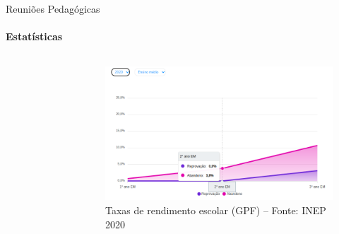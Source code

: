 \documentclass[aspectratio=169]{beamer}
\begin{document}
\begin{frame}{Reuniões Pedagógicas}
\framesubtitle{Estatísticas}
\begin{columns}
	\begin{figure}[htb!]
		\centering
	\end{figure}

	\begin{figure}[htb!]
		\centering
		\includegraphics[width=\linewidth]{estatistica-2020.png}
			\caption{Taxas de rendimento escolar (GPF) -- Fonte: INEP 2020}
	\end{figure}

\end{columns}
\end{frame}
\end{document}
